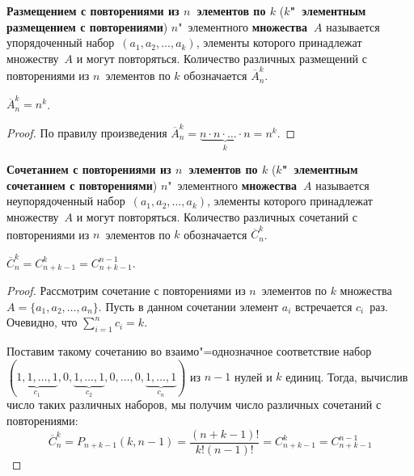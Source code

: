  \textbf{Размещением с повторениями из $n$~элементов по $k$} (\textbf{$k$"~элементным размещением с повторениями}) $n$"~элементного \textbf{множества~$A$} называется упорядоченный набор~$(a_1, a_2, \ldots, a_k)$, элементы которого принадлежат множеству~$A$ и могут повторяться.
Количество различных размещений с повторениями из $n$~элементов по $k$ обозначается $\overline A_n^k$.

\begin{statement}
$\overline A_n^k = n^k$.
\end{statement}
\begin{proof}
По правилу произведения $\overline A_n^k = \underbrace{n \cdot n \cdot \ldots \cdot n}_k = n^k$.
\end{proof}

 \textbf{Сочетанием с повторениями из $n$~элементов по $k$} (\textbf{$k$"~элементным сочетанием с повторениями}) $n$"~элементного \textbf{множества~$A$} называется неупорядоченный набор~$(a_1, a_2, \ldots, a_k)$, элементы которого принадлежат множеству~$A$ и могут повторяться.
Количество различных сочетаний с повторениями из $n$~элементов по $k$ обозначается $\overline C_n^k$.

\begin{statement}
$\overline C_n^k = C_{n+k-1}^k = C_{n+k-1}^{n-1}$.
\end{statement}
\begin{proof}
Рассмотрим сочетание с повторениями из $n$~элементов по $k$ множества $A = \{ a_1, a_2, \ldots, a_n \}$.
Пусть в данном сочетании элемент $a_i$ встречается $c_i$~раз.
Очевидно, что $\sum\limits_{i=1}^n c_i = k$.

Поставим такому сочетанию во взаимо"=однозначное соответствие набор $(\underbrace{1, 1, \ldots, 1}_{c_1}, 0, \underbrace{1, \ldots, 1}_{c_2}, 0, \ldots, 0, \underbrace{1, \ldots, 1}_{c_n})$ из $n - 1$ нулей и $k$ единиц.
Тогда, вычислив число таких различных наборов, мы получим число различных сочетаний с повторениями:
\begin{equation*}
\overline C_n^k = P_{n + k - 1}(k, n - 1) = \frac{(n + k - 1)!}{k!(n - 1)!} = C_{n+k-1}^k = C_{n+k-1}^{n-1}
\end{equation*}
\end{proof}